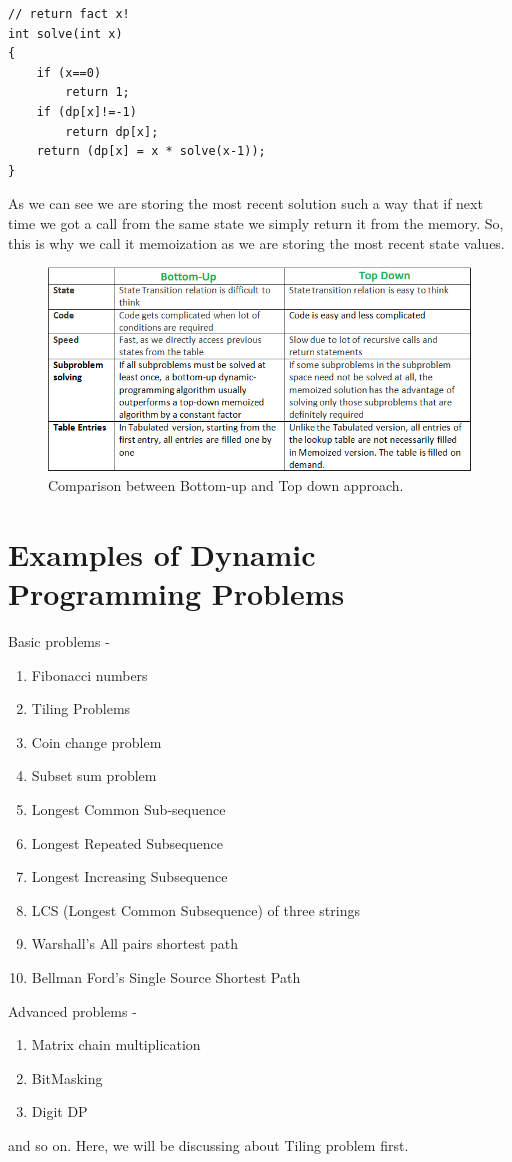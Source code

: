 \documentclass[12pt]{article}
\begin{document}
{\begin{lstlisting}
// return fact x!
int solve(int x)
{
    if (x==0)
        return 1;
    if (dp[x]!=-1)
        return dp[x];
    return (dp[x] = x * solve(x-1));
}
\end{lstlisting}
\vspace{3mm}
As we can see we are storing the most recent solution such a way that if next time we got a call from the same state we simply return it from the memory. So, this is why we call it memoization as we are storing the most recent state values.
\begin{figure}[H]
\centering
\includegraphics[width=1.0\textwidth]{TabulationvsMemoization.png}
\caption{Comparison between Bottom-up and Top down approach.}
\end{figure}

\section {Examples of Dynamic Programming Problems}
Basic problems -
\begin{enumerate}
\item Fibonacci numbers
\item Tiling Problems
\item Coin change problem
\item Subset sum problem
\item Longest Common Sub-sequence
\item Longest Repeated Subsequence
\item Longest Increasing Subsequence
\item LCS (Longest Common Subsequence) of three strings
\item Warshall’s All pairs shortest path
\item Bellman Ford’s Single Source Shortest Path
\end{enumerate}

Advanced problems - 
\begin{enumerate}
\item Matrix chain multiplication
\item BitMasking
\item Digit DP
\end{enumerate} and so on. Here, we will be discussing about Tiling problem first.

}
\end{document}
